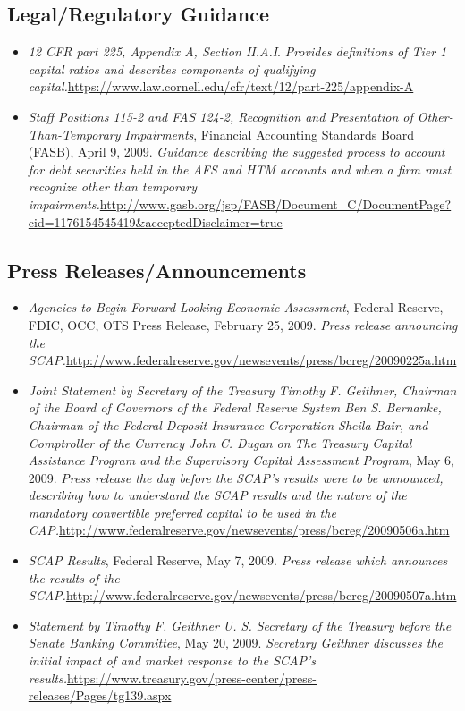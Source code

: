 \documentclass[justified, nobib]{tufte-handout2}
\begin{document}
\subsection{Legal/Regulatory Guidance}

\begin{itemize}
\item
\emph{12
  CFR part 225, Appendix A, Section II.A.I}. \emph{Provides definitions
  of Tier 1 capital ratios and describes components of qualifying
  capital.}\url{https://www.law.cornell.edu/cfr/text/12/part-225/appendix-A}
\item
\emph{Staff
  Positions 115-2 and FAS 124-2, Recognition and Presentation of
  Other-Than-Temporary Impairments}, Financial Accounting Standards
  Board (FASB), April 9, 2009. \emph{Guidance describing the suggested
  process to account for debt securities held in the AFS and HTM
  accounts and when a firm must recognize other than temporary
  impairments.}\url{http://www.gasb.org/jsp/FASB/Document_C/DocumentPage?cid=1176154545419&acceptedDisclaimer=true}
\end{itemize}

\subsection{Press Releases/Announcements}

\begin{itemize}
\item
\emph{Agencies
  to Begin Forward-Looking Economic Assessment}, Federal Reserve, FDIC,
  OCC, OTS Press Release, February 25, 2009. \emph{Press release
  announcing the SCAP.}\url{http://www.federalreserve.gov/newsevents/press/bcreg/20090225a.htm}
\item
\emph{Joint
  Statement by Secretary of the Treasury Timothy F. Geithner, Chairman
  of the Board of Governors of the Federal Reserve System Ben S.
  Bernanke, Chairman of the Federal Deposit Insurance Corporation Sheila
  Bair, and Comptroller of the Currency John C. Dugan on The Treasury
  Capital Assistance Program and the Supervisory Capital Assessment
  Program}, May 6, 2009. \emph{Press release the day before the SCAP's
  results were to be announced, describing how to understand the SCAP
  results and the nature of the mandatory convertible preferred capital
  to be used in the CAP.}\url{http://www.federalreserve.gov/newsevents/press/bcreg/20090506a.htm}
\item
\emph{SCAP
  Results}, Federal Reserve, May 7, 2009. \emph{Press release which
  announces the results of the SCAP.}\url{http://www.federalreserve.gov/newsevents/press/bcreg/20090507a.htm}
\item
\emph{Statement
  by Timothy F. Geithner U. S. Secretary of the Treasury before the
  Senate Banking Committee}, May 20, 2009. \emph{Secretary Geithner
  discusses the initial impact of and market response to the SCAP's
  results.}\url{https://www.treasury.gov/press-center/press-releases/Pages/tg139.aspx}
\end{itemize}
\end{document}
